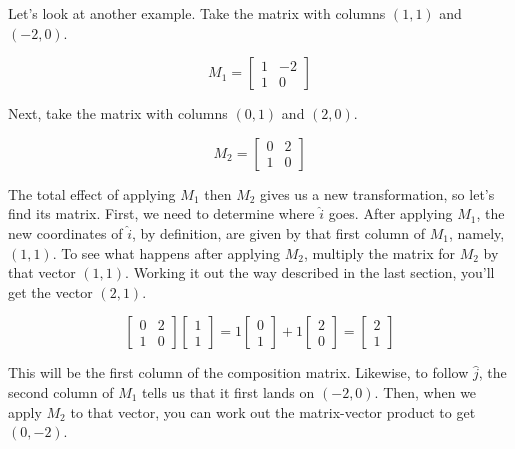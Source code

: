 Let's look at another example. Take the matrix with columns $(1, 1)$ and
$(-2, 0)$.

\begin{equation*}
  M_1 = \begin{bmatrix}
    1 & -2 \\
    1 & 0
  \end{bmatrix}
\end{equation*}

Next, take the matrix with columns $(0, 1)$ and $(2, 0)$.

\begin{equation*}
  M_2 = \begin{bmatrix}
    0 & 2 \\
    1 & 0
  \end{bmatrix}
\end{equation*}

The total effect of applying $M_1$ then $M_2$ gives us a new transformation, so
let's find its matrix. First, we need to determine where $\hat{i}$ goes. After
applying $M_1$, the new coordinates of $\hat{i}$, by definition, are given by
that first column of $M_1$, namely, $(1, 1)$. To see what happens after applying
$M_2$, multiply the matrix for $M_2$ by that vector $(1, 1)$. Working it out the
way described in the last section, you'll get the vector $(2, 1)$.

\begin{equation*}
  \begin{bmatrix}
    0 & 2 \\
    1 & 0
  \end{bmatrix}
  \begin{bmatrix}
    1 \\
    1
  \end{bmatrix} = 1
  \begin{bmatrix}
    0 \\
    1
  \end{bmatrix} + 1
  \begin{bmatrix}
    2 \\
    0
  \end{bmatrix} =
  \begin{bmatrix}
    2 \\
    1
  \end{bmatrix}
\end{equation*}

This will be the first column of the composition matrix. Likewise, to follow
$\hat{j}$, the second column of $M_1$ tells us that it first lands on $(-2, 0)$.
Then, when we apply $M_2$ to that vector, you can work out the matrix-vector
product to get $(0, -2)$.

